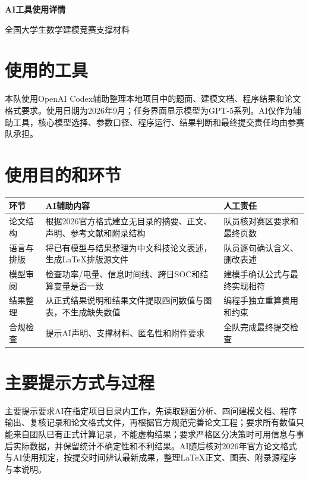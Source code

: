 \documentclass[UTF8,zihao=-4]{ctexart}
\begin{document}
\begin{center}
{\bfseries AI工具使用详情\par}
\vspace{0.8em}
{全国大学生数学建模竞赛支撑材料}
\end{center}

\section{使用的工具}

本队使用OpenAI Codex辅助整理本地项目中的题面、建模文档、程序结果和论文格式要求。使用日期为2026年9月；任务界面显示模型为GPT-5系列。AI仅作为辅助工具，核心模型选择、参数口径、程序运行、结果判断和最终提交责任均由参赛队承担。

\section{使用目的和环节}

{\small
\setlength{\tabcolsep}{4pt}
\begin{tabular}{p{1.7cm}p{6.0cm}p{5.2cm}}
\toprule
环节 & AI辅助内容 & 人工责任 \\
\midrule
论文结构 & 根据2026官方格式建立无目录的摘要、正文、声明、参考文献和附录结构 & 队员核对赛区要求和最终页数 \\
语言与排版 & 将已有模型与结果整理为中文科技论文表述，生成LaTeX排版源文件 & 队员逐句确认含义、删改表述 \\
模型审阅 & 检查功率/电量、信息时间线、跨日SOC和结算变量是否一致 & 建模手确认公式与最终实现相符 \\
结果整理 & 从正式结果说明和结果文件提取四问数值与图表，不生成缺失数值 & 编程手独立重算费用和约束 \\
合规检查 & 提示AI声明、支撑材料、匿名性和附件要求 & 全队完成最终提交检查 \\
\bottomrule
\end{tabular}
}

\section{主要提示方式与过程}

主要提示要求AI在指定项目目录内工作，先读取题面分析、四问建模文档、程序输出、复核记录和论文格式文件，再根据官方规范完善论文工程；要求所有数值只能来自团队已有正式计算记录，不能虚构结果；要求严格区分决策时可用信息与事后实际数据，并保留统计不确定性和不利结果。AI随后核对2026年官方论文格式与AI使用规定，按提交时间辨认最新成果，整理LaTeX正文、图表、附录源程序与本说明。
\end{document}
